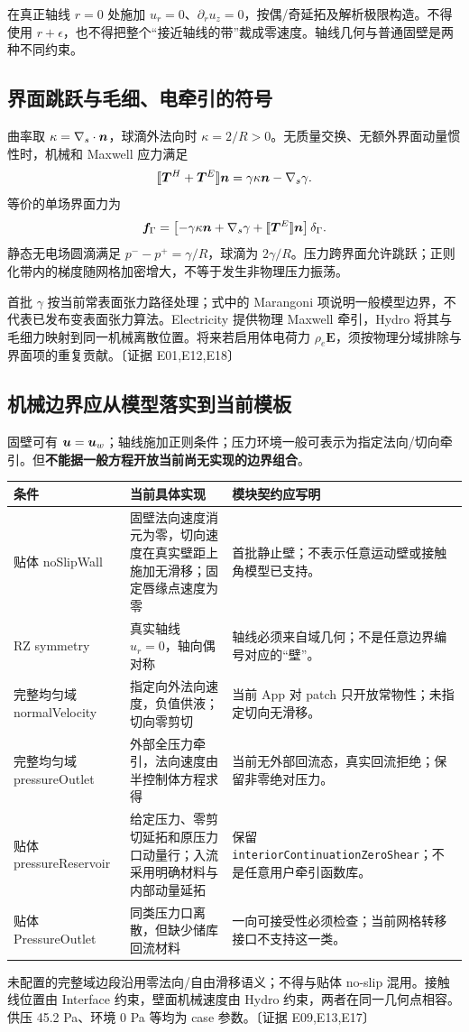 \documentclass[UTF8,a4paper,11pt,fontset=fandol]{ctexart}
\newcommand{\code}[1]{\nolinkurl{#1}}
\newcommand{\ev}[1]{{\small\color{muted}〔证据 #1〕}}
\begin{document}
在真正轴线 $r=0$ 处施加 $u_r=0$、$\partial_r u_z=0$，按偶/奇延拓及解析极限构造。不得使用 $r+\epsilon$，也不得把整个“接近轴线的带”裁成零速度。轴线几何与普通固壁是两种不同约束。

\subsection{界面跳跃与毛细、电牵引的符号}
曲率取 $\kappa=\nabla_s\cdot\bm n$，球滴外法向时 $\kappa=2/R>0$。无质量交换、无额外界面动量惯性时，机械和 Maxwell 应力满足
\begin{equation}
 [\![\bm T^H+\bm T^E]\!]\bm n
   =\gamma\kappa\bm n-\nabla_s\gamma.
 \label{eq:traction}
\end{equation}
等价的单场界面力为
\[
 \bm f_\Gamma=\left[-\gamma\kappa\bm n+\nabla_s\gamma
          +[\![\bm T^E]\!]\bm n\right]\delta_\Gamma.
\]
静态无电场圆滴满足 $p^- -p^+=\gamma/R$，球滴为 $2\gamma/R$。压力跨界面允许跳跃；正则化带内的梯度随网格加密增大，不等于发生非物理压力振荡。

首批 $\gamma$ 按当前常表面张力路径处理；式中的 Marangoni 项说明一般模型边界，不代表已发布变表面张力算法。Electricity 提供物理 Maxwell 牵引，Hydro 将其与毛细力映射到同一机械离散位置。将来若启用体电荷力 $\rho_e\bm E$，须按物理分域排除与界面项的重复贡献。\ev{E01,E12,E18}

\subsection{机械边界应从模型落实到当前模板}
固壁可有 $\bm u=\bm u_w$；轴线施加正则条件；压力环境一般可表示为指定法向/切向牵引。但\textbf{不能据一般方程开放当前尚无实现的边界组合}。

\begin{longtable}{@{}P{.20\textwidth}P{.39\textwidth}P{.35\textwidth}@{}}
\toprule 条件 & 当前具体实现 & 模块契约应写明\\\midrule\endhead
贴体 noSlipWall & 固壁法向速度消元为零，切向速度在真实壁距上施加无滑移；固定唇缘点速度为零 & 首批静止壁；不表示任意运动壁或接触角模型已支持。\\
RZ symmetry & 真实轴线 $u_r=0$，轴向偶对称 & 轴线必须来自域几何；不是任意边界编号对应的“壁”。\\
完整均匀域 normalVelocity & 指定向外法向速度，负值供液；切向零剪切 & 当前 App 对 patch 只开放常物性；未指定切向无滑移。\\
完整均匀域 pressureOutlet & 外部全压力牵引，法向速度由半控制体方程求得 & 当前无外部回流态，真实回流拒绝；保留非零绝对压力。\\
贴体 pressureReservoir & 给定压力、零剪切延拓和原压力口动量行；入流采用明确材料与内部动量延拓 & 保留 \code{interiorContinuationZeroShear}；不是任意用户牵引函数库。\\
贴体 PressureOutlet & 同类压力口离散，但缺少储库回流材料 & 一向可接受性必须检查；当前网格转移接口不支持这一类。\\
\bottomrule
\end{longtable}
未配置的完整域边段沿用零法向/自由滑移语义；不得与贴体 no-slip 混用。接触线位置由 Interface 约束，壁面机械速度由 Hydro 约束，两者在同一几何点相容。供压 45.2 Pa、环境 0 Pa 等均为 case 参数。\ev{E09,E13,E17}
\end{document}
